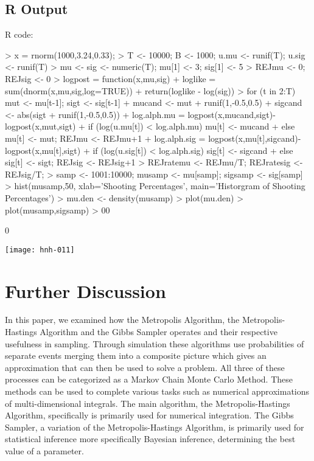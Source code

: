 \documentclass[11pt,a4paper]{article}
\theoremstyle{plain}
\begin{document}
\subsection*{R Output}
R code:
\begin{Schunk}
\begin{Sinput}
> x = rnorm(1000,3.24,0.33);
> T <- 10000; B <- 1000; u.mu <- runif(T); u.sig <- runif(T)
> mu <- sig <- numeric(T); mu[1] <- 3; sig[1] <- 5 
> REJmu <- 0; REJsig <- 0 
> logpost = function(x,mu,sig){ 
+ loglike = sum(dnorm(x,mu,sig,log=TRUE))
+ return(loglike - log(sig))}
> for (t in 2:T) { mut <- mu[t-1]; sigt <- sig[t-1] 
+ mucand <- mut + runif(1,-0.5,0.5) 
+ sigcand <- abs(sigt + runif(1,-0.5,0.5)) 
+ log.alph.mu = logpost(x,mucand,sigt)-logpost(x,mut,sigt) 
+ if (log(u.mu[t]) < log.alph.mu) mu[t] <- mucand 
+ else { mu[t] <- mut; REJmu <- REJmu+1 } 
+ log.alph.sig = logpost(x,mu[t],sigcand)-logpost(x,mu[t],sigt) 
+ if (log(u.sig[t]) < log.alph.sig) sig[t] <- sigcand 
+ else { sig[t] <- sigt; REJsig <- REJsig+1 }} 
> REJratemu <- REJmu/T; REJratesig <- REJsig/T; 
> samp <- 1001:10000; musamp <- mu[samp]; sigsamp <- sig[samp] 
> hist(musamp,50, xlab='Shooting Percentages', main='Historgram of Shooting Percentages') 
> mu.den <- density(musamp)
> plot(mu.den)  
> plot(musamp,sigsamp) 
> 00
\end{Sinput}
\begin{Soutput}
[1] 0
\end{Soutput}
\end{Schunk}
\texttt{[image: hnh-011]}


\newpage
\section*{Further Discussion}

In this paper, we examined how the Metropolis Algorithm, the Metropolis- Hastings Algorithm and the Gibbs Sampler operates and their respective usefulness in sampling. Through simulation these algorithms use  probabilities of separate events merging them into a composite picture which gives an approximation that can then be used to solve a problem. All three of these processes can be categorized as a Markov Chain Monte Carlo Method. These methods can be used to complete various tasks such as numerical approximations of multi-dimensional integrals. The main algorithm, the Metropolis-Hastings Algorithm, specifically is primarily used for numerical integration. The Gibbs Sampler, a variation of the Metropolis-Hastings Algorithm, is primarily used for statistical inference more specifically Bayesian inference, determining the best value of a parameter. 
\end{document}
